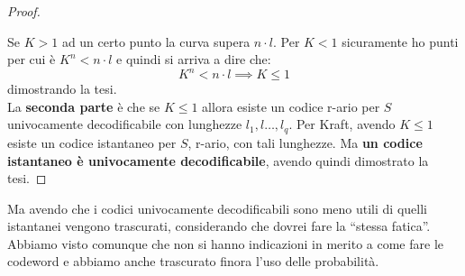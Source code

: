 \documentclass[a4paper,12pt, oneside]{book}
\begin{document}
\begin{proof}
\begin{figure}[H]
  \end{figure}
  Se $K>1$ ad un certo punto la curva supera $n\cdot l$. Per $K<1$ sicuramente
  ho punti per cui è $K^n<n\cdot l$ e quindi si arriva a dire che:
  \[K^n<n\cdot l\implies K\leq 1\]
  dimostrando la tesi.\\
  La \textbf{seconda parte} è che se $K\leq 1$ allora esiste un codice r-ario
  per $S$ univocamente decodificabile con lunghezze $l_1,l\dots,l_q$. Per Kraft,
  avendo $K\leq 1$ esiste un codice istantaneo per $S$, r-ario, con tali
  lunghezze. Ma \textbf{un codice istantaneo è univocamente decodificabile},
  avendo quindi dimostrato la tesi.
\end{proof}
Ma avendo che i codici univocamente decodificabili sono meno utili di quelli
istantanei vengono trascurati, considerando che dovrei fare la ``stessa
fatica''.\\
Abbiamo visto comunque che non si hanno indicazioni in merito a come fare le
codeword e abbiamo anche trascurato finora l'uso delle probabilità.
\end{document}
